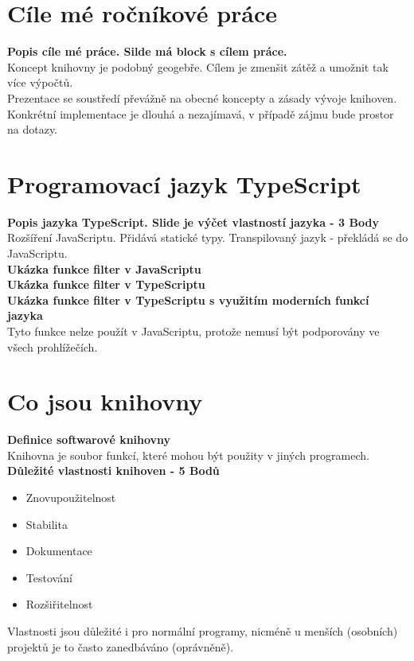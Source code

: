 

\section{Cíle mé ročníkové práce} {
  \textbf{Popis cíle mé práce. Silde má block s cílem práce.} \\
  Koncept knihovny je podobný geogebře. Cílem je zmenšit zátěž a umožnit tak více výpočtů. \\
  Prezentace se soustředí převážně na obecné koncepty a zásady vývoje knihoven. \\
  Konkrétní implementace je dlouhá a nezajímavá, v případě zájmu bude prostor na dotazy. \\
 }

\section{Programovací jazyk TypeScript} {
  \textbf{Popis jazyka TypeScript. Slide je výčet vlastností jazyka - 3 Body} \\
  Rozšíření JavaScriptu. Přidává statické typy. Transpilovaný jazyk - překládá se do JavaScriptu. \\
  \textbf{Ukázka funkce filter v JavaScriptu} \\
  \textbf{Ukázka funkce filter v TypeScriptu} \\
  \textbf{Ukázka funkce filter v TypeScriptu s využitím moderních funkcí jazyka} \\
  Tyto funkce nelze použít v JavaScriptu, protože nemusí být podporovány ve všech prohlížečích. \\
 }

\section{Co jsou knihovny} {
  \textbf{Definice softwarové knihovny} \\
  Knihovna je soubor funkcí, které mohou být použity v jiných programech. \\
  \textbf{Důležité vlastnosti knihoven - 5 Bodů} \\
  \begin{itemize}
      \item Znovupoužitelnost
      \item Stabilita
      \item Dokumentace
      \item Testování
      \item Rozšiřitelnost
  \end{itemize}
  Vlastnosti jsou důležité i pro normální programy, nicméně u menších (osobních) projektů je to často zanedbáváno (oprávněně). \\
 }
\pagebreak
